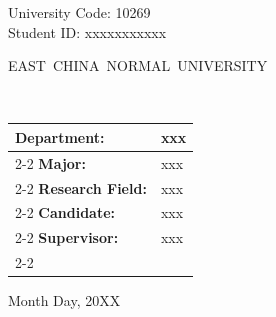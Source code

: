 \newpage

\pagestyle{empty}

\newline
\hspace*{\fill} {University Code: 10269}\\
\hspace*{\fill} {Student ID:
xxxxxxxxxxx
}%

\vskip 2cm

\begin{center}
    {\fontsize{26pt}{36pt}\selectfont{}\mdseries\mbox{EAST CHINA NORMAL UNIVERSITY}}
\end{center}

\vskip 3cm

\begin{center}
    {\fontsize{16.4pt}{24pt}\selectfont\bfseries \thesisETitle}\\
\end{center}

\vskip 2cm {\sihao
        \begin{center}
            \renewcommand\arraystretch{1.15}
            \begin{tabular}{l >{\centering\arraybackslash}p{8.5cm}}
                \bfseries Department: & xxx \\ \cline{2-2}
                \bfseries Major: & xxx \\ \cline{2-2}
                \bfseries Research Field: & xxx \\ \cline{2-2}
                \bfseries Candidate: & xxx \\ \cline{2-2}
                \bfseries Supervisor: & xxx \\ \cline{2-2}
            \end{tabular}
        \end{center}}

\vfill

\begin{center}
    {\fontsize{16pt}{20pt}\selectfont Month Day, 20XX}
\end{center}

